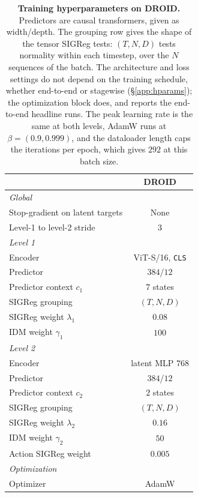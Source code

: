 \begin{table}[ht]
\centering
\small
\setlength{\tabcolsep}{6pt}
\caption{\textbf{Training hyperparameters on DROID.} Predictors are causal transformers, given as
width/depth. The grouping row
gives the shape of the tensor SIGReg tests: $(T,N,D)$ tests normality within each timestep,
over the $N$ sequences of the batch. The architecture and loss settings do not depend on
the training schedule, whether end-to-end or stagewise (\S\ref{app:hparams}); the
optimization block does, and reports the end-to-end headline runs. The peak learning rate is
the same at both levels, AdamW runs at $\beta = (0.9, 0.999)$, and the dataloader length caps the
iterations per epoch, which gives $292$ at this batch size.}
\label{tab:hparams}
\begin{tabular}{lc}
\toprule
 & DROID \\
\midrule
\multicolumn{2}{l}{\emph{Global}} \\
Stop-gradient on latent targets & None \\
Level-1 to level-2 stride       & $3$ \\
\midrule
\multicolumn{2}{l}{\emph{Level 1}} \\
Encoder                         & ViT-S/16, \texttt{CLS} \\
Predictor                       & $384$/$12$ \\
Predictor context $c_1$         & $7$ states \\
SIGReg grouping                 & $(T,N,D)$ \\
SIGReg weight $\lambda_1$       & $0.08$ \\
IDM weight $\gamma_1$           & $100$ \\
\midrule
\multicolumn{2}{l}{\emph{Level 2}} \\
Encoder                         & latent MLP $768$ \\
Predictor                       & $384$/$12$ \\
Predictor context $c_2$         & $2$ states \\
SIGReg grouping                 & $(T,N,D)$ \\
SIGReg weight $\lambda_2$       & $0.16$ \\
IDM weight $\gamma_2$           & $50$ \\
Action SIGReg weight            & $0.005$ \\
\midrule
\multicolumn{2}{l}{\emph{Optimization}} \\
Optimizer                       & AdamW \\

\end{tabular}
\end{table}
